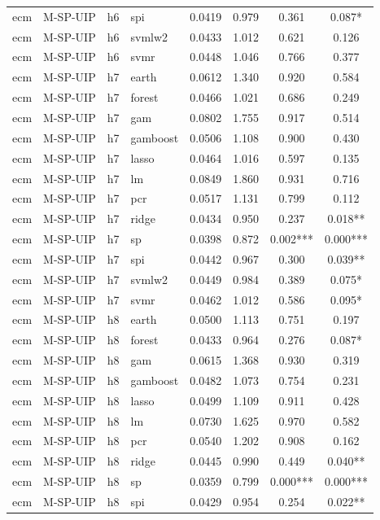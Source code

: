 \begin{ThreePartTable}
\begin{longtable}[t]{llclcccc}
ecm & M-SP-UIP & h6 & spi & 0.0419 & 0.979 & 0.361 & 0.087*\\
ecm & M-SP-UIP & h6 & svmlw2 & 0.0433 & 1.012 & 0.621 & 0.126\\
ecm & M-SP-UIP & h6 & svmr & 0.0448 & 1.046 & 0.766 & 0.377\\
\addlinespace
ecm & M-SP-UIP & h7 & earth & 0.0612 & 1.340 & 0.920 & 0.584\\
ecm & M-SP-UIP & h7 & forest & 0.0466 & 1.021 & 0.686 & 0.249\\
ecm & M-SP-UIP & h7 & gam & 0.0802 & 1.755 & 0.917 & 0.514\\
ecm & M-SP-UIP & h7 & gamboost & 0.0506 & 1.108 & 0.900 & 0.430\\
ecm & M-SP-UIP & h7 & lasso & 0.0464 & 1.016 & 0.597 & 0.135\\
ecm & M-SP-UIP & h7 & lm & 0.0849 & 1.860 & 0.931 & 0.716\\
ecm & M-SP-UIP & h7 & pcr & 0.0517 & 1.131 & 0.799 & 0.112\\
ecm & M-SP-UIP & h7 & ridge & 0.0434 & 0.950 & 0.237 & 0.018**\\
ecm & M-SP-UIP & h7 & sp & 0.0398 & 0.872 & 0.002*** & 0.000***\\
ecm & M-SP-UIP & h7 & spi & 0.0442 & 0.967 & 0.300 & 0.039**\\
ecm & M-SP-UIP & h7 & svmlw2 & 0.0449 & 0.984 & 0.389 & 0.075*\\
ecm & M-SP-UIP & h7 & svmr & 0.0462 & 1.012 & 0.586 & 0.095*\\
\addlinespace
ecm & M-SP-UIP & h8 & earth & 0.0500 & 1.113 & 0.751 & 0.197\\
ecm & M-SP-UIP & h8 & forest & 0.0433 & 0.964 & 0.276 & 0.087*\\
ecm & M-SP-UIP & h8 & gam & 0.0615 & 1.368 & 0.930 & 0.319\\
ecm & M-SP-UIP & h8 & gamboost & 0.0482 & 1.073 & 0.754 & 0.231\\
ecm & M-SP-UIP & h8 & lasso & 0.0499 & 1.109 & 0.911 & 0.428\\
ecm & M-SP-UIP & h8 & lm & 0.0730 & 1.625 & 0.970 & 0.582\\
ecm & M-SP-UIP & h8 & pcr & 0.0540 & 1.202 & 0.908 & 0.162\\
ecm & M-SP-UIP & h8 & ridge & 0.0445 & 0.990 & 0.449 & 0.040**\\
ecm & M-SP-UIP & h8 & sp & 0.0359 & 0.799 & 0.000*** & 0.000***\\
ecm & M-SP-UIP & h8 & spi & 0.0429 & 0.954 & 0.254 & 0.022**\\

\end{longtable}
\end{ThreePartTable}
